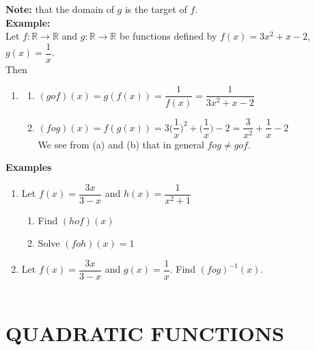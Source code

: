 \documentclass[11pt,a4paper]{article}
\begin{document}
\textbf{Note:} that the domain of $g$ is the target of $f$.\\

\textbf{Example:}\\
Let $f:\mathbb{R}\longrightarrow \mathbb{R}$ and $g:\mathbb{R}\longrightarrow \mathbb{R}$ be functions defined by $f(x)=3x^2+x-2$, $g(x)=\dfrac{1}{x}$.\\

Then
\begin{enumerate}
\item[]
\begin{enumerate}
      \item $(gof)(x)=g(f(x))=\dfrac{1}{f(x)}=\dfrac{1}{3x^2+x-2}$\\
      \item $(fog)(x)=f(g(x))=3\bigg(\dfrac{1}{x}\bigg)^2+\bigg(\dfrac{1}{x}\bigg)-2=\dfrac{3}{x^2}+\dfrac{1}{x}-2$\\
      
      We see from (a) and (b) that in general $fog\neq gof$.\\
\end{enumerate}
\end{enumerate} 



\textbf{Examples}
\begin{enumerate}
\item Let $f(x)=\dfrac{3x}{3-x}$ and $h(x)=\dfrac{1}{x^2+1}$
\begin{enumerate}
      \item Find $(hof)(x)$
      \item Solve $(foh)(x)=1$
\end{enumerate}

\item Let $f(x)=\dfrac{3x}{3-x}$ and $g(x)=\dfrac{1}{x}$. Find $(fog)^{-1}(x)$.\\\\
\end{enumerate}














\pagebreak
\section{QUADRATIC FUNCTIONS}
\end{document}
